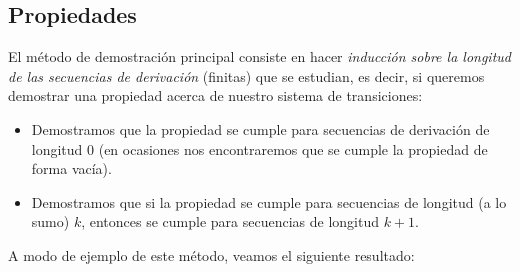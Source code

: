 \subsection{Propiedades}

El método de demostración principal consiste en hacer \textit{inducción sobre la longitud de las secuencias de derivación} (finitas) que se estudian, es decir, si queremos demostrar una propiedad acerca de nuestro sistema de transiciones:
\begin{itemize}
    \item Demostramos que la propiedad se cumple para secuencias de derivación de longitud 0 (en ocasiones nos encontraremos que se cumple la propiedad de forma vacía).
    \item Demostramos que si la propiedad se cumple para secuencias de longitud (a lo sumo) $k$, entonces se cumple para secuencias de longitud $k+1$.
\end{itemize}
A modo de ejemplo de este método, veamos el siguiente resultado:


